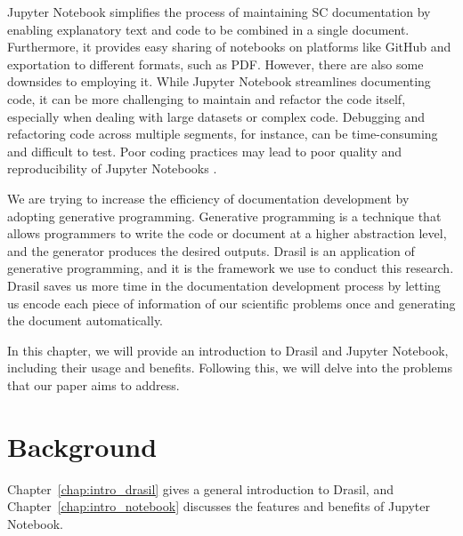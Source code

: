 Jupyter Notebook simplifies the process of maintaining SC documentation by 
enabling explanatory text and code to be combined in a single document. 
Furthermore, it provides easy sharing of notebooks on platforms like GitHub and 
exportation to different formats, such as PDF. However, there are also some 
downsides to employing it. While Jupyter Notebook streamlines documenting code, 
it can be more challenging to maintain and refactor the code itself, especially 
when dealing with large datasets or complex code. Debugging and refactoring 
code across multiple segments, for instance, can be time-consuming and 
difficult to test. Poor coding practices may lead to poor quality and 
reproducibility of Jupyter Notebooks \cite{pimentel2021understanding, 
wang2020better}.

We are trying to increase the efficiency of documentation development by 
adopting generative programming. Generative programming is a technique that 
allows programmers to write the code or document at a higher abstraction level, 
and the generator produces the desired outputs. Drasil is an application of 
generative programming, and it is the framework we use to conduct this 
research. Drasil saves us more time in the documentation development process by 
letting us encode each piece of information of our scientific problems once and 
generating the document automatically.

In this chapter, we will provide an introduction to Drasil and Jupyter 
Notebook, including their usage and benefits. Following this, we will delve 
into the problems that our paper aims to address.

\section{Background}
Chapter~\ref{chap:intro_drasil} gives a general introduction to Drasil, and
Chapter~\ref{chap:intro_notebook} discusses the features and benefits of 
Jupyter Notebook.

